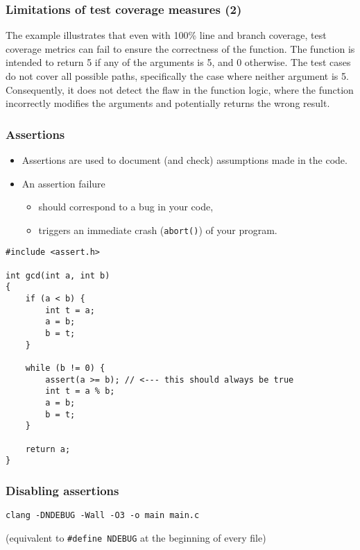 \documentclass[12pt]{article}
\begin{document}
\subsubsection{Limitations of test coverage measures (2)}

The example illustrates that even with 100\% line and branch coverage, test coverage metrics can fail to ensure the correctness of the function. The function is intended to return 5 if any of the arguments is 5, and 0 otherwise. The test cases do not cover all possible paths, specifically the case where neither argument is 5. Consequently, it does not detect the flaw in the function logic, where the function incorrectly modifies the arguments and potentially returns the wrong result.

\subsubsection{Assertions}

\begin{itemize}
    \item Assertions are used to document (and check) assumptions made in the code.
    \item An assertion failure
    \begin{itemize}
        \item should correspond to a bug in your code,
        \item triggers an immediate crash (\texttt{abort()}) of your program.
    \end{itemize}
\end{itemize}
\begin{verbatim}
#include <assert.h>

int gcd(int a, int b)
{
    if (a < b) {
        int t = a;
        a = b;
        b = t;
    }

    while (b != 0) {
        assert(a >= b); // <--- this should always be true
        int t = a % b;
        a = b;
        b = t;
    }

    return a;
}
\end{verbatim}

\subsubsection{Disabling assertions}

\begin{verbatim}
clang -DNDEBUG -Wall -O3 -o main main.c
\end{verbatim}
(equivalent to \texttt{\#define NDEBUG} at the beginning of every file)
\end{document}
